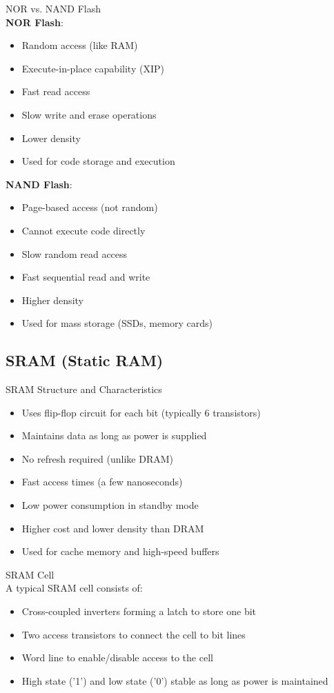 \begin{definition}{NOR vs. NAND Flash}\\
\textbf{NOR Flash}:
\begin{itemize}
    \item Random access (like RAM)
    \item Execute-in-place capability (XIP)
    \item Fast read access
    \item Slow write and erase operations
    \item Lower density
    \item Used for code storage and execution
\end{itemize}
\textbf{NAND Flash}:
\begin{itemize}
    \item Page-based access (not random)
    \item Cannot execute code directly
    \item Slow random read access
    \item Fast sequential read and write
    \item Higher density
    \item Used for mass storage (SSDs, memory cards)
\end{itemize}
\end{definition}

\subsection{SRAM (Static RAM)}

\begin{concept}{SRAM Structure and Characteristics}
\begin{itemize}
    \item Uses flip-flop circuit for each bit (typically 6 transistors)
    \item Maintains data as long as power is supplied
    \item No refresh required (unlike DRAM)
    \item Fast access times (a few nanoseconds)
    \item Low power consumption in standby mode
    \item Higher cost and lower density than DRAM
    \item Used for cache memory and high-speed buffers
\end{itemize}
\end{concept}

\begin{definition}{SRAM Cell}\\
A typical SRAM cell consists of:
\begin{itemize}
    \item Cross-coupled inverters forming a latch to store one bit
    \item Two access transistors to connect the cell to bit lines
    \item Word line to enable/disable access to the cell
    \item High state ('1') and low state ('0') stable as long as power is maintained
\end{itemize}
\end{definition}


